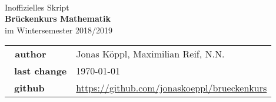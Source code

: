 \documentclass{report}
\theoremstyle{changebreak} %
\numberwithin{theorem}{chapter}
\numberwithin{theorem}{chapter}
\numberwithin{theorem}{chapter}
\numberwithin{theorem}{chapter}
\numberwithin{theorem}{chapter}
\numberwithin{theorem}{chapter}
\begin{document}
\begin{titlepage}
  \ \newline\newline\newline\newline\newline

  \begin{center}

  \huge Inoffizielles Skript\\
  \Huge\textbf{Brückenkurs Mathematik}\\
  \huge im Wintersemester 2018/2019\\
  \normalsize

  \vspace{1cm}
  \begin{tabular}[b]{l|l}
  \textbf{\ author}      & Jonas Köppl, Maximilian Reif, N.N.\\\
  \textbf{last change}   & \today\\\
  \textbf{github}        & \url{https://github.com/jonaskoeppl/brueckenkurs}
  \end{tabular}
  \vspace{1cm}

  \end{center}

\end{titlepage}

\tableofcontents







\end{document}
